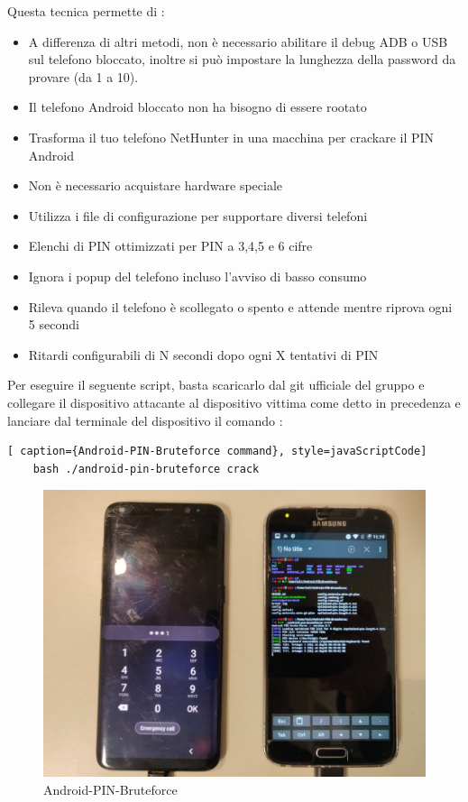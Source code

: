 Questa tecnica permette di :
\begin{itemize}
	\item A differenza di altri metodi, non è necessario abilitare il debug ADB o USB sul telefono bloccato, inoltre si può impostare la lunghezza della password da provare (da 1 a 10).
	\item Il telefono Android bloccato non ha bisogno di essere rootato
	\item Trasforma il tuo telefono NetHunter in una macchina per crackare il PIN Android
	\item Non è necessario acquistare hardware speciale
	\item Utilizza i file di configurazione per supportare diversi telefoni
	\item Elenchi di PIN ottimizzati per PIN a 3,4,5 e 6 cifre
	\item Ignora i popup del telefono incluso l’avviso di basso consumo
	\item Rileva quando il telefono è scollegato o spento e attende mentre riprova ogni 5 secondi
	\item Ritardi configurabili di N secondi dopo ogni X tentativi di PIN
\end{itemize}

Per eseguire il seguente script, basta scaricarlo dal git ufficiale del gruppo e collegare il dispositivo attacante al dispositivo vittima come detto in precedenza e lanciare dal terminale del dispositivo il comando :

\begin{lstlisting}[ caption={Android-PIN-Bruteforce command}, style=javaScriptCode]
	bash ./android-pin-bruteforce crack
\end{lstlisting}

\begin{figure}[h!]
    \centering
    \includegraphics[width=140mm]{Immagini/3/brute.jpg}
    \caption{Android-PIN-Bruteforce}
    \label{fig:Android-PIN-Bruteforce}
\end{figure}

